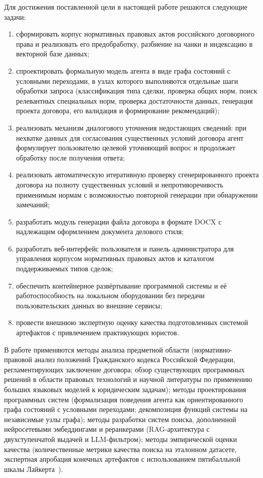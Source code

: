 Для достижения поставленной цели в настоящей работе решаются следующие задачи:
\begin{enumerate}
    \item сформировать корпус нормативных правовых актов российского договорного права и реализовать его предобработку, разбиение на чанки и индексацию в векторной базе данных;
    \item спроектировать формальную модель агента в виде графа состояний с условными переходами, в узлах которого выполняются отдельные шаги обработки запроса (классификация типа сделки, проверка общих норм, поиск релевантных специальных норм, проверка достаточности данных, генерация проекта договора, его валидация и формирование рекомендаций);
    \item реализовать механизм диалогового уточнения недостающих сведений: при нехватке данных для согласования существенных условий договора агент формулирует пользователю целевой уточняющий вопрос и продолжает обработку после получения ответа;
    \item реализовать автоматическую итеративную проверку сгенерированного проекта договора на полноту существенных условий и непротиворечивость применимым нормам с возможностью повторной генерации при обнаружении замечаний;
    \item разработать модуль генерации файла договора в формате DOCX с надлежащим оформлением документа делового стиля;
    \item разработать веб-интерфейс пользователя и панель администратора для управления корпусом нормативных правовых актов и каталогом поддерживаемых типов сделок;
    \item обеспечить контейнерное развёртывание программной системы и её работоспособность на локальном оборудовании без передачи пользовательских данных во внешние сервисы;
    \item провести внешнюю экспертную оценку качества подготовленных системой артефактов с привлечением практикующих юристов.
\end{enumerate}

В работе применяются методы анализа предметной области (нормативно-правовой анализ положений Гражданского кодекса Российской Федерации, регламентирующих заключение договора; обзор существующих программных решений в области правовых технологий и научной литературы по применению больших языковых моделей к юридическим задачам); методы проектирования программных систем (формализация поведения агента как ориентированного графа состояний с условными переходами; декомпозиция функций системы на независимые узлы графа); методы разработки систем поиска, дополненной нейросетевыми эмбеддингами и реранкерами (RAG-архитектура с двухступенчатой выдачей и LLM-фильтром); методы эмпирической оценки качества (количественные метрики качества поиска на эталонном датасете, экспертная апробация конечных артефактов с использованием пятибалльной шкалы Лайкерта~\cite{likert1932}).

